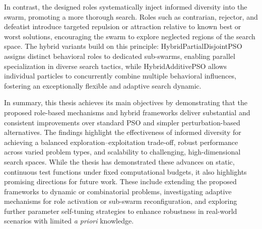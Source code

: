 In contrast, the designed roles systematically inject informed diversity into the swarm, promoting a more thorough search.
Roles such as contrarian, rejector, and defeatist introduce targeted repulsion or attraction relative to known best or worst solutions, encouraging the swarm to explore neglected regions of the search space. The hybrid variants build on this principle: HybridPartialDisjointPSO assigns distinct behavioral roles to dedicated sub-swarms, enabling parallel specialization in diverse search tactics, while HybridAdditivePSO allows individual particles to concurrently combine multiple behavioral influences, fostering an exceptionally flexible and adaptive search dynamic.

In summary, this thesis achieves its main objectives by demonstrating that the proposed role-based mechanisms and hybrid frameworks deliver substantial and consistent improvements over standard PSO and simpler perturbation-based alternatives. The findings highlight the effectiveness of informed diversity for achieving a balanced exploration–exploitation trade-off, robust performance across varied problem types, and scalability to challenging, high-dimensional search spaces. While the thesis has demonstrated these advances on static, continuous test functions under fixed computational budgets, it also highlights promising directions for future work. These include extending the proposed frameworks to dynamic or combinatorial problems, investigating adaptive mechanisms for role activation or sub-swarm reconfiguration, and exploring further parameter self-tuning strategies to enhance robustness in real-world scenarios with limited \textit{a priori} knowledge.








